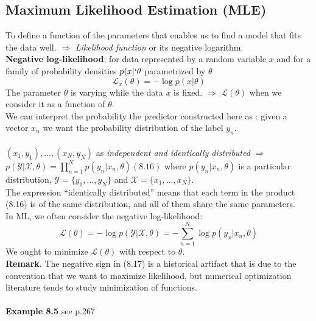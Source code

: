 \subsection{Maximum Likelihood Estimation (MLE)}
To define a function of the parameters that enables us to find a model that fits the data
well. $\Rightarrow$ \textit{Likelihood function} or its negative logarithm.\\
\textbf{Negative log-likelihood}: for data represented by a random variable $x$ and for a family of probability densities $p(x|`\theta$ parametrized by $\theta$
\[
\mathcal{L}_x (\theta) = - \log p(x|\theta) \tag{8.14}
\]
The parameter $\theta$ is varying while the data $x$ is fixed. $\Rightarrow$ $\mathcal{L} (\theta)$ when we consider it as a function of $\theta$.\\
We can interpret the probability the predictor constructed here as : given a vector $x_n$ we want the probability distribution of the label $y_n$.\\ \\
$(x_1, y_1),\dots,(x_N,y_N)$ as \textit{independent and identically distributed} $\Rightarrow$ $p(\mathcal{Y} | \mathcal{X}, \theta) = \prod_{n=1}^{N} p(y_n|x_n, \theta) (8.16)$ where $p(y_n| x_n, \theta)$ is a particular distribution, $\mathcal{Y} = \{y_1,\dots, y_N\}$ and $\mathcal{X} = \{x_1,\dots,x_N\}$. \\
The expression “identically distributed” means that each term in the product (8.16) is of the same distribution, and all of them share the same parameters.\\
In ML, we often consider the negative log-likelihood:
\[
\mathcal{L} (\theta) = - \log p(\mathcal{Y}| \mathcal{X}, \theta) = - \sum_{n=1}^{N} \log p(y_x|x_n, \theta) \tag{8.17}
\]
We ought to minimize $\mathcal{L} (\theta)$ with respect to $\theta$. \\
\textbf{Remark}. The negative sign in (8.17) is a historical artifact that is due to the convention that we want to maximize likelihood, but numerical optimization literature tends to study minimization of functions.\\ \\
\textbf{Example 8.5} see p.267

